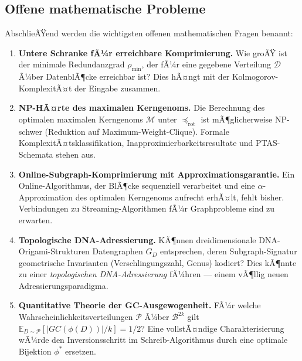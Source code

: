 ﻿\documentclass[a4paper,12pt]{article}
\theoremstyle{definition}
\theoremstyle{plain}
\begin{document}
\subsection{Offene mathematische Probleme}
\label{ssec:offene_probleme}

AbschlieÃŸend werden die wichtigsten offenen mathematischen Fragen benannt:

\begin{enumerate}
  \item \textbf{Untere Schranke fÃ¼r erreichbare Komprimierung.}
        Wie groÃŸ ist der minimale Redundanzgrad $\rho_{\min}$, der fÃ¼r
        eine gegebene Verteilung $\mathcal{D}$ Ã¼ber DatenblÃ¶cke erreichbar
        ist?  Dies hÃ¤ngt mit der Kolmogorov-KomplexitÃ¤t der Eingabe
        zusammen.

  \item \textbf{NP-HÃ¤rte des maximalen Kerngenoms.}
        Die Berechnung des optimalen maximalen Kerngenoms $\mathcal{M}$
        unter $\preceq_{\mathrm{rot}}$ ist mÃ¶glicherweise NP-schwer
        (Reduktion auf Maximum-Weight-Clique).  Formale
        KomplexitÃ¤tsklassifikation, Inapproximierbarkeitsresultate und
        PTAS-Schemata stehen aus.

  \item \textbf{Online-Subgraph-Komprimierung mit Approximationsgarantie.}
        Ein Online-Algorithmus, der BlÃ¶cke sequenziell verarbeitet und eine
        $\alpha$-Approximation des optimalen Kerngenoms aufrecht erhÃ¤lt,
        fehlt bisher.  Verbindungen zu Streaming-Algorithmen fÃ¼r
        Graphprobleme sind zu erwarten.

  \item \textbf{Topologische DNA-Adressierung.}
        KÃ¶nnen dreidimensionale DNA-Origami-Struk\-turen Datengraphen $G_D$
        entsprechen, deren Subgraph-Signatur geometrische Invarianten
        (Verschlingungszahl, Genus) kodiert?  Dies kÃ¶nnte zu einer
        \emph{topologischen DNA-Adressierung} fÃ¼hren --- einem
        vÃ¶llig neuen Adressierungsparadigma.

  \item \textbf{Quantitative Theorie der GC-Ausgewogenheit.}
        FÃ¼r welche Wahrscheinlichkeitsverteilungen $\mathcal{P}$ Ã¼ber
        $\mathcal{B}^{2k}$ gilt
        $\mathbb{E}_{D \sim \mathcal{P}}[|GC(\phi(D))|/k] = 1/2$?
        Eine vollstÃ¤ndige Charakterisierung wÃ¼rde den Inversionsschritt
        im Schreib-Algorithmus durch eine optimale Bijektion $\phi^*$
        ersetzen.


\end{enumerate}
\end{document}
